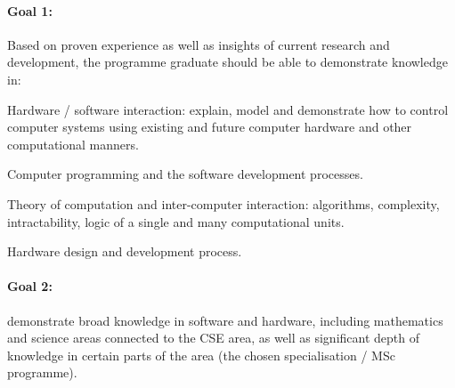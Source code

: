 
\paragraph{Goal 1:} Based on proven experience as well as insights of
current research and development, the programme graduate should be
able to demonstrate knowledge in:

Hardware / software interaction: explain, model and demonstrate how to
control computer systems using existing and future computer hardware
and other computational manners.

Computer programming and the software development processes.

Theory of computation and inter-computer interaction: algorithms,
complexity, intractability, logic of a single and many computational
units.

Hardware design and development process. 


% 

\paragraph{Goal 2:} demonstrate broad knowledge in software and
hardware, including mathematics and science areas connected to the CSE
area, as well as significant depth of knowledge in certain parts of
the area (the chosen specialisation / MSc programme).

